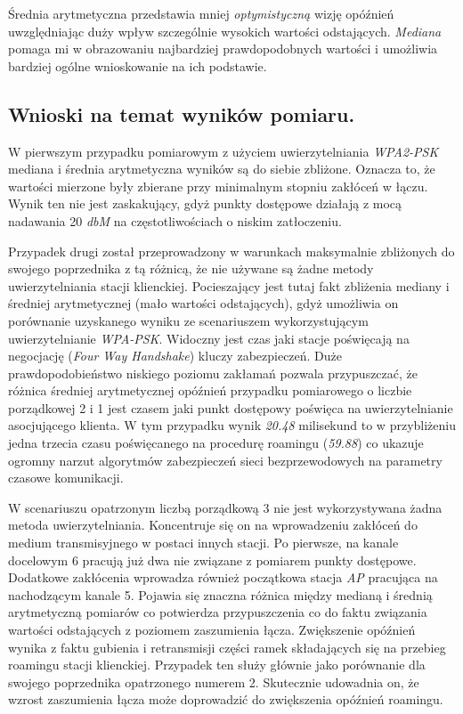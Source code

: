 Średnia arytmetyczna przedstawia mniej \emph{optymistyczną} wizję opóźnień uwzględniając duży wpływ szczególnie wysokich wartości odstających. \emph{Mediana} pomaga mi w obrazowaniu najbardziej prawdopodobnych wartości i umożliwia bardziej ogólne wnioskowanie na ich podstawie.

\subsection{Wnioski na temat wyników pomiaru.}

W pierwszym przypadku pomiarowym z użyciem uwierzytelniania \emph{WPA2-PSK} mediana i średnia arytmetyczna wyników są do siebie zbliżone. Oznacza to, że wartości mierzone były zbierane przy minimalnym stopniu zakłóceń w łączu. Wynik ten nie jest zaskakujący, gdyż punkty dostępowe działają z mocą nadawania 20 \emph{dbM} na częstotliwościach o niskim zatłoczeniu.

Przypadek drugi został przeprowadzony w warunkach maksymalnie zbliżonych do swojego poprzednika z tą różnicą, że nie używane są żadne metody uwierzytelniania stacji klienckiej. Pocieszający jest tutaj fakt zbliżenia mediany i średniej arytmetycznej (mało wartości odstających), gdyż umożliwia on porównanie uzyskanego wyniku ze scenariuszem wykorzystującym uwierzytelnianie \emph{WPA-PSK}. Widoczny jest czas jaki stacje poświęcają na negocjację (\emph{Four Way Handshake}) kluczy zabezpieczeń. Duże prawdopodobieństwo niskiego poziomu zakłamań pozwala przypuszczać, że różnica średniej arytmetycznej opóźnień przypadku pomiarowego o liczbie porządkowej 2 i 1 jest czasem jaki punkt dostępowy poświęca na uwierzytelnianie asocjującego klienta. W tym przypadku wynik \emph{20.48} milisekund to w przybliżeniu jedna trzecia czasu poświęcanego na procedurę roamingu (\emph{59.88}) co ukazuje ogromny narzut algorytmów zabezpieczeń sieci bezprzewodowych na parametry czasowe komunikacji.

W scenariuszu opatrzonym liczbą porządkową 3 nie jest wykorzystywana żadna metoda uwierzytelniania. Koncentruje się on na wprowadzeniu zakłóceń do medium transmisyjnego w postaci innych stacji. Po pierwsze, na kanale docelowym 6 pracują już dwa nie związane z pomiarem punkty dostępowe. Dodatkowe zakłócenia wprowadza również początkowa stacja \emph{AP} pracująca na nachodzącym kanale 5. Pojawia się znaczna różnica między medianą i średnią arytmetyczną pomiarów co potwierdza przypuszczenia co do faktu związania wartości odstających z poziomem zaszumienia łącza. Zwiększenie opóźnień wynika z faktu gubienia i retransmisji części ramek składających się na przebieg roamingu stacji klienckiej. Przypadek ten służy głównie jako porównanie dla swojego poprzednika opatrzonego numerem 2. Skutecznie udowadnia on, że wzrost zaszumienia łącza może doprowadzić do zwiększenia opóźnień roamingu.

